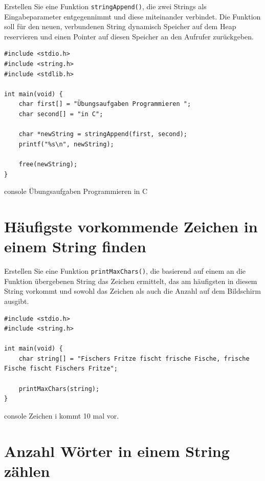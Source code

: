 Erstellen Sie eine Funktion \texttt{stringAppend()}, die zwei Strings als
Eingabeparameter entgegennimmt und diese miteinander verbindet. Die Funktion
soll für den neuen, verbundenen String dynamisch Speicher auf dem Heap
reservieren und einen Pointer auf diesen Speicher an den Aufrufer zurückgeben.

\Vorlage
\begin{verbatim}
#include <stdio.h>
#include <string.h>
#include <stdlib.h>

int main(void) {
    char first[] = "Übungsaufgaben Programmieren ";
    char second[] = "in C";

    char *newString = stringAppend(first, second);
    printf("%s\n", newString);

    free(newString);
}
\end{verbatim}

\begin{mybox}[Bildschirmausgabe]{console}
Übungsaufgaben Programmieren in C
\end{mybox}





\chapter{Häufigste vorkommende Zeichen in einem String finden}

\vspace{10pt}

Erstellen Sie eine Funktion \texttt{printMaxChars()}, die basierend auf
einem an die Funktion übergebenen String das Zeichen ermittelt, das am
häufigsten in diesem String vorkommt und sowohl das Zeichen als auch die Anzahl
auf dem Bildschirm ausgibt.

\Vorlage
\begin{verbatim}
#include <stdio.h>
#include <string.h>

int main(void) {
    char string[] = "Fischers Fritze fischt frische Fische, frische Fische fischt Fischers Fritze";

    printMaxChars(string);
}
\end{verbatim}

\begin{mybox}[Bildschirmausgabe]{console}
Zeichen i kommt 10 mal vor.
\end{mybox}




\chapter{Anzahl Wörter in einem String zählen}


